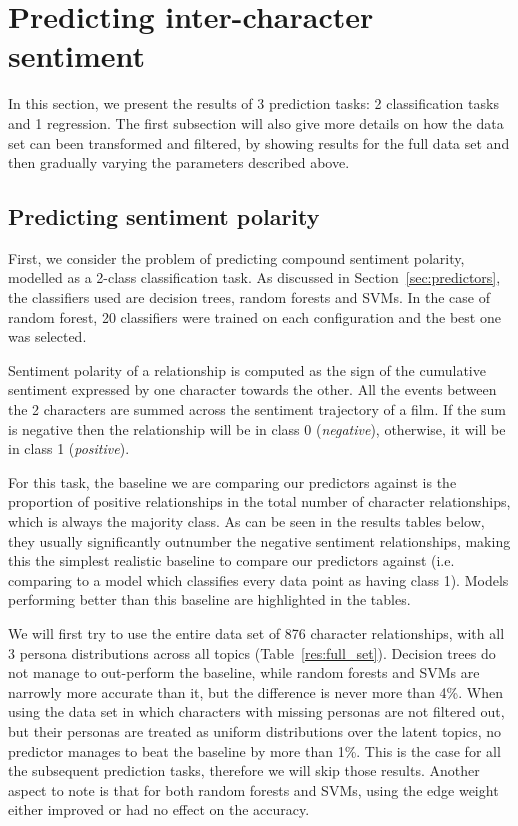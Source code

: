 \documentclass[bsc,frontabs,singlespacing,parskip]{infthesis} %
\begin{document}
\section{Predicting inter-character sentiment}

In this section, we present the results of 3 prediction tasks: 2 classification tasks and 1 regression. The first subsection will also give more details on how the data set can been transformed and filtered, by showing results for the full data set and then gradually varying the parameters described above.

\subsection{Predicting sentiment polarity}
First, we consider the problem of predicting compound sentiment polarity, modelled as a 2-class classification task. As discussed in Section~\ref{sec:predictors}, the classifiers used are decision trees, random forests and SVMs. In the case of random forest, 20 classifiers were trained on each configuration and the best one was selected.

Sentiment polarity of a relationship is computed as the sign of the cumulative sentiment expressed by one character towards the other. All the events between the 2 characters are summed across the sentiment trajectory of a film. If the sum is negative then the relationship will be in class 0 (\textit{negative}), otherwise, it will be in class 1 (\textit{positive}).

For this task, the baseline we are comparing our predictors against is the proportion of positive relationships in the total number of character relationships, which is always the majority class. As can be seen in the results tables below, they usually significantly outnumber the negative sentiment relationships, making this the simplest realistic baseline to compare our predictors against (i.e. comparing to a model which classifies every data point as having class 1). Models performing better than this baseline are highlighted in the tables.

We will first try to use the entire data set of 876 character relationships, with all 3 persona distributions across all topics (Table~\ref{res:full_set}). Decision trees do not manage to out-perform the baseline, while random forests and SVMs are narrowly more accurate than it, but the difference is never more than 4\%. When using the data set in which characters with missing personas are not filtered out, but their personas are treated as uniform distributions over the latent topics, no predictor manages to beat the baseline by more than 1\%. This is the case for all the subsequent prediction tasks, therefore we will skip those results. Another aspect to note is that for both random forests and SVMs, using the edge weight either improved or had no effect on the accuracy.
\end{document}
